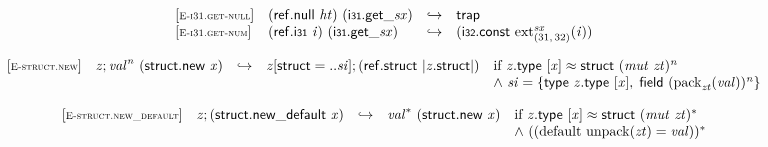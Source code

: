 \vspace{1ex}

$$
\begin{array}{@{}l@{}lcl@{}l@{}}
{[\textsc{\scriptsize E{-}i31.get{-}null}]} \quad & (\mathsf{ref.null}~{\mathit{ht}})~({{\mathsf{i{\scriptstyle31}.get}}{\mathsf{\_}}}{{\mathit{sx}}}) &\hookrightarrow& \mathsf{trap} &  \\
{[\textsc{\scriptsize E{-}i31.get{-}num}]} \quad & (\mathsf{ref.i{\scriptstyle31}}~{\mathit{i}})~({{\mathsf{i{\scriptstyle31}.get}}{\mathsf{\_}}}{{\mathit{sx}}}) &\hookrightarrow& (\mathsf{i{\scriptstyle32}}.\mathsf{const}~{{{{\mathrm{ext}}}_{(31,\, 32)}^{{\mathit{sx}}}}}{({\mathit{i}})}) &  \\
\end{array}
$$

\vspace{1ex}

$$
\begin{array}{@{}l@{}lcl@{}l@{}}
{[\textsc{\scriptsize E{-}struct.new}]} \quad & {\mathit{z}} ; {{\mathit{val}}^{{\mathit{n}}}}~(\mathsf{struct.new}~{\mathit{x}}) &\hookrightarrow& {\mathit{z}}[\mathsf{struct} = ..{\mathit{si}}] ; (\mathsf{ref.struct}~{|{\mathit{z}}.\mathsf{struct}|}) &\quad
  \mbox{if}~{\mathit{z}}.\mathsf{type}~[{\mathit{x}}] \approx \mathsf{struct}~{({\mathit{mut}}~{\mathit{zt}})^{{\mathit{n}}}} \\
 &&&&\quad {\land}~{\mathit{si}} = \{ \begin{array}[t]{@{}l@{}}
\mathsf{type}~{\mathit{z}}.\mathsf{type}~[{\mathit{x}}],\; \mathsf{field}~{({{\mathrm{pack}}}_{{\mathit{zt}}}({\mathit{val}}))^{{\mathit{n}}}} \}\end{array} \\
\end{array}
$$

$$
\begin{array}{@{}l@{}lcl@{}l@{}}
{[\textsc{\scriptsize E{-}struct.new\_default}]} \quad & {\mathit{z}} ; (\mathsf{struct.new\_default}~{\mathit{x}}) &\hookrightarrow& {{\mathit{val}}^\ast}~(\mathsf{struct.new}~{\mathit{x}}) &\quad
  \mbox{if}~{\mathit{z}}.\mathsf{type}~[{\mathit{x}}] \approx \mathsf{struct}~{({\mathit{mut}}~{\mathit{zt}})^\ast} \\
 &&&&\quad {\land}~(({\mathrm{default}}~{\mathrm{unpack}}({\mathit{zt}}) = {\mathit{val}}))^\ast \\
\end{array}
$$

\vspace{1ex}

